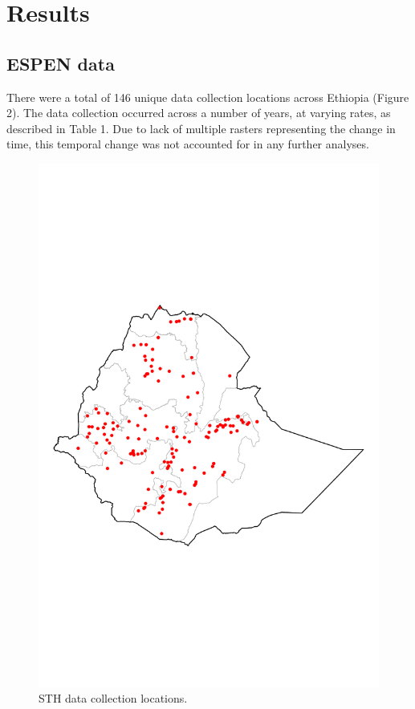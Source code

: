 \documentclass[
]{article}
\begin{document}
\hypertarget{results}{%
\section{Results}\label{results}}

\hypertarget{espen-data}{%
\subsection{ESPEN data}\label{espen-data}}

There were a total of 146 unique data collection locations across
Ethiopia (Figure 2). The data collection occurred across a number of
years, at varying rates, as described in Table 1. Due to lack of
multiple rasters representing the change in time, this temporal change
was not accounted for in any further analyses.

\begin{figure}
\centering
\includegraphics{write_up_files/figure-latex/STH_locations-1.pdf}
\caption{STH data collection locations.}
\end{figure}
\end{document}
